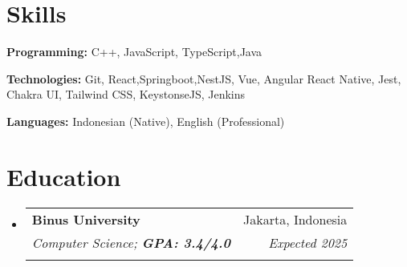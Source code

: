 \documentclass[letterpaper,11pt]{article}
\makeatletter
\newcommand{\resumeItem}[1]{
  \item\small{
    {#1 \vspace{-2pt}}
  }
}
\newcommand{\resumeEducationHeading}[6]{
  \vspace{-2pt}\item
    \begin{tabular*}{0.97\textwidth}[t]{l@{\extracolsep{\fill}}r}
      \textbf{#1} & #2 \\
      \textit{\small#3} & \textit{\small #4} \\
      \textit{\small#5} & \textit{\small #6} \\
    \end{tabular*}\vspace{-5pt}
}
\newcommand{\resumeSubHeadingListStart}{\begin{itemize}[leftmargin=0.15in, label={}]}
\newcommand{\resumeSubHeadingListEnd}{\end{itemize}}
\newcommand{\resumeItemListStart}{\begin{itemize}}
\newcommand{\resumeItemListEnd}{\end{itemize}\vspace{-5pt}}
\makeatother
\begin{document}




\section{Skills}
  \vspace{1pt}
  \resumeSubHeadingListStart
    \small{\item{
        \textbf{Programming:}{ C++, JavaScript, TypeScript,Java} \\ \vspace{2pt}
        
        \textbf{Technologies:}{ Git, React,Springboot,NestJS, Vue, Angular React Native, Jest, Chakra UI, Tailwind CSS, KeystonseJS, Jenkins} \\ \vspace{2pt}
        
        \textbf{Languages:}{ Indonesian (Native), English (Professional)}
        
    }}
  \resumeSubHeadingListEnd


\section{Education}
  \vspace{3pt}
  \resumeSubHeadingListStart
    
    \resumeEducationHeading
      {Binus University
      }{Jakarta, Indonesia}
      {Computer Science;   \textbf{GPA: 3.4/4.0}}{Expected 2025}
      { }{ }
    
  \resumeSubHeadingListEnd


    
\end{document}
